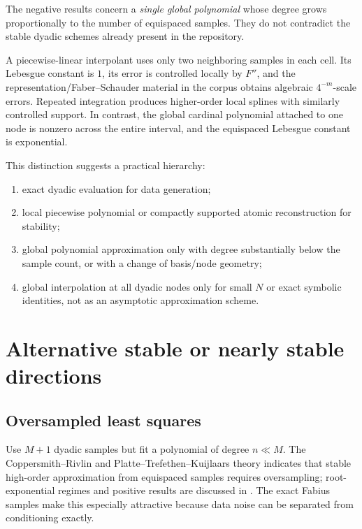\documentclass[11pt,oneside]{article}
\theoremstyle{definition}
\theoremstyle{remark}
\begin{document}
The negative results concern a \emph{single global polynomial} whose degree grows proportionally to the number of equispaced samples.  They do not contradict the stable dyadic schemes already present in the repository.

A piecewise-linear interpolant uses only two neighboring samples in each cell.  Its Lebesgue constant is $1$, its error is controlled locally by $F''$, and the representation/Faber--Schauder material in the corpus obtains algebraic $4^{-m}$-scale errors.  Repeated integration produces higher-order local splines with similarly controlled support.  In contrast, the global cardinal polynomial attached to one node is nonzero across the entire interval, and the equispaced Lebesgue constant is exponential.

This distinction suggests a practical hierarchy:
\begin{enumerate}[leftmargin=2em]
\item exact dyadic evaluation for data generation;
\item local piecewise polynomial or compactly supported atomic reconstruction for stability;
\item global polynomial approximation only with degree substantially below the sample count, or with a change of basis/node geometry;
\item global interpolation at all dyadic nodes only for small $N$ or exact symbolic identities, not as an asymptotic approximation scheme.
\end{enumerate}

\section{Alternative stable or nearly stable directions}
\label{sec:alternatives}

\subsection{Oversampled least squares}

Use $M+1$ dyadic samples but fit a polynomial of degree $n\ll M$.  The Coppersmith--Rivlin and Platte--Trefethen--Kuijlaars theory indicates that stable high-order approximation from equispaced samples requires oversampling; root-exponential regimes and positive results are discussed in \cite{platte-trefethen-kuijlaars,adcock-shadrin}.  The exact Fabius samples make this especially attractive because data noise can be separated from conditioning exactly.
\end{document}
